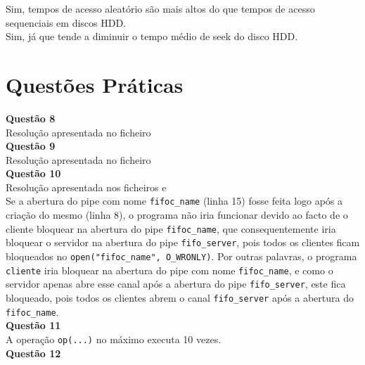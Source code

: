 \documentclass[a4paper, 11pt]{article}
\begin{document}
\noindent {} Sim, tempos de acesso aleatório são mais altos do que tempos de acesso sequenciais em discos HDD.\\

\noindent {} Sim, já que tende a diminuir o tempo médio de seek do disco HDD.

\newpage

\section*{Questões Práticas}

\noindent \textbf{Questão 8}\\

\noindent Resolução apresentada no ficheiro \\


\noindent \textbf{Questão 9}\\

\noindent Resolução apresentada no ficheiro \\


\noindent \textbf{Questão 10}\\

\noindent Resolução apresentada nos ficheiros  e \\

\noindent Se a abertura do pipe com nome \texttt{fifoc\_name} (linha 15) fosse feita logo após a criação do mesmo (linha 8), o programa não iria funcionar devido ao facto de o cliente bloquear na abertura do pipe \texttt{fifoc\_name}, que consequentemente iria bloquear o servidor na abertura do pipe \texttt{fifo\_server}, pois todos os clientes ficam bloqueados no \texttt{open("fifoc\_name", O\_WRONLY)}. Por outras palavras, o programa \texttt{cliente} iria bloquear na abertura do pipe com nome \texttt{fifoc\_name}, e como o servidor apenas abre esse canal após a abertura do pipe \texttt{fifo\_server}, este fica bloqueado, pois todos os clientes abrem o canal \texttt{fifo\_server} após a abertura do \texttt{fifoc\_name}.\\


\noindent \textbf{Questão 11}\\

\noindent {} A operação \texttt{op(...)} no máximo executa 10 vezes.\\


\noindent \textbf{Questão 12}\\
\end{document}

